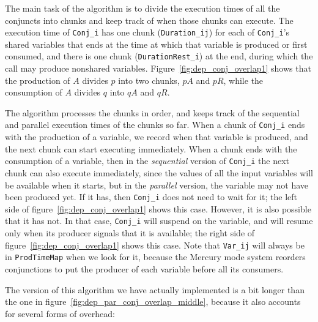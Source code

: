 The main task of the algorithm is
to divide the execution times of all the conjuncts into chunks
and keep track of when those chunks can execute.
The execution time of \verb|Conj_i|
has one chunk (\verb|Duration_ij|) for each of \verb|Conj_i|'s shared variables
that ends at the time at which that variable is produced or first consumed,
and there is one chunk (\verb|DurationRest_i|) at the end,
during which the call may produce nonshared variables.
Figure~\ref{fig:dep_conj_overlap1} shows that
the production of $A$ divides $p$ into two chunks, ${pA}$ and ${pR}$,
while the consumption of $A$ divides $q$ into ${qA}$ and ${qR}$.

The algorithm processes the chunks in order, and keeps track
of the sequential and parallel execution times of the chunks so far.
When a chunk of \verb|Conj_i| ends with the production of a variable,
we record when that variable is produced,
and the next chunk can start executing immediately.
When a chunk ends with the consumption of a variable,
then in the \emph{sequential} version of \verb|Conj_i|
the next chunk can also execute immediately,
since the values of all the input variables will be available when it starts,
but in the \emph{parallel} version,
the variable may not have been produced yet.
If it has, then \verb|Conj_i| does not need to wait for it;
the left side of figure~\ref{fig:dep_conj_overlap1} shows this case.
However, it is also possible that it has not.
In that case, \verb|Conj_i| will suspend on the variable,
and will resume only when its producer signals that it is available;
the right side of figure~\ref{fig:dep_conj_overlap1} shows this case.
Note that \verb|Var_ij|
will always be in \verb|ProdTimeMap| when we look for it,
because the Mercury mode system reorders conjunctions
to put the producer of each variable before all its consumers.

The version of this algorithm we have actually implemented is 
a bit longer than the one in figure~\ref{fig:dep_par_conj_overlap_middle},
because it also accounts for several forms of overhead:

